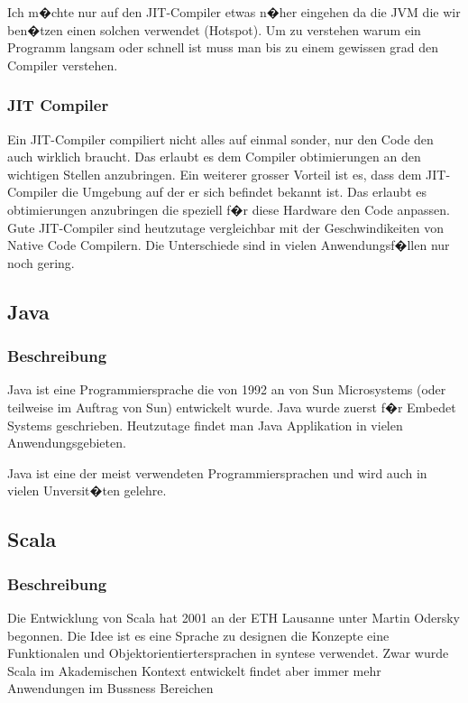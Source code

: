 \documentclass{fancydocument}
\begin{document}
Ich m�chte nur auf den JIT-Compiler etwas n�her eingehen da die JVM
die wir ben�tzen einen solchen verwendet (Hotspot). Um zu verstehen warum ein
Programm langsam oder schnell ist muss man bis zu einem gewissen grad
den Compiler verstehen.

\subsubsection{JIT Compiler}

Ein JIT-Compiler compiliert nicht alles auf einmal sonder, nur den
Code den auch wirklich braucht. Das erlaubt es dem Compiler
obtimierungen an den wichtigen Stellen anzubringen. Ein weiterer
grosser Vorteil ist es, dass dem JIT-Compiler die Umgebung auf der er
sich befindet bekannt ist. Das erlaubt es obtimierungen anzubringen
die speziell f�r diese Hardware den Code anpassen.
\\
Gute JIT-Compiler sind heutzutage vergleichbar mit der Geschwindikeiten
von Native Code Compilern. Die Unterschiede sind in vielen
Anwendungsf�llen nur noch gering. 

 

\subsection{Java}

\subsubsection{Beschreibung}

Java ist eine Programmiersprache die von 1992 an von Sun Microsystems (oder
teilweise im Auftrag von Sun) entwickelt wurde. Java wurde zuerst f�r
Embedet Systems geschrieben. Heutzutage findet man Java Applikation in
vielen Anwendungsgebieten.

Java ist eine der meist verwendeten Programmiersprachen und wird auch
in vielen Unversit�ten gelehre. 


\subsection{Scala}

\subsubsection{Beschreibung}

Die Entwicklung von Scala hat 2001 an der ETH Lausanne unter Martin
Odersky begonnen. Die Idee ist es eine Sprache zu designen die
Konzepte eine Funktionalen und Objektorientiertersprachen in syntese
verwendet. Zwar wurde Scala im Akademischen Kontext entwickelt findet
aber immer mehr Anwendungen im Bussness Bereichen
\end{document}
